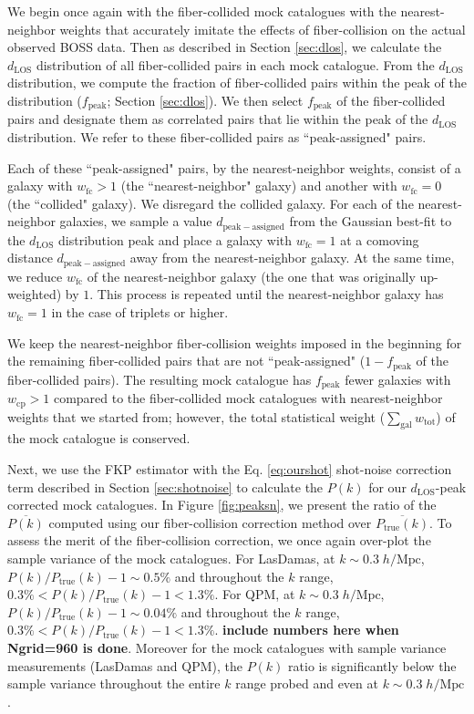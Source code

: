 \documentclass{emulateapj}
\begin{document}
We begin once again with the fiber-collided mock catalogues with the nearest-neighbor weights that accurately imitate the effects of fiber-collision on the actual observed BOSS data. Then as described in Section \ref{sec:dlos}, we calculate the $d_\mathrm{LOS}$ distribution of all fiber-collided pairs in each mock catalogue. From the $d_\mathrm{LOS}$ distribution, we compute the fraction of fiber-collided pairs within the peak of the distribution ($f_\mathrm{peak}$; Section \ref{sec:dlos}). We then select $f_\mathrm{peak}$ of the fiber-collided pairs and designate them as correlated pairs that lie within the peak of the $d_\mathrm{LOS}$ distribution. We refer to these fiber-collided pairs as ``peak-assigned" pairs.  

Each of these ``peak-assigned" pairs, by the nearest-neighbor weights, consist of a galaxy with $w_\mathrm{fc} > 1$ (the ``nearest-neighbor" galaxy) and another with $w_\mathrm{fc} = 0$ (the ``collided" galaxy). We disregard the collided galaxy. For each of the nearest-neighbor galaxies, we sample a value $d_\mathrm{peak-assigned}$ from the Gaussian best-fit to the $d_\mathrm{LOS}$ distribution peak and place a galaxy with $w_\mathrm{fc} = 1$ at a comoving distance $d_\mathrm{peak-assigned}$ away from the nearest-neighbor galaxy. At the same time, we reduce $w_\mathrm{fc}$ of the nearest-neighbor galaxy (the one that was originally up-weighted) by $1$. This process is repeated until the nearest-neighbor galaxy has $w_\mathrm{fc} =1$ in the case of triplets or higher. 

We keep the nearest-neighbor fiber-collision weights imposed in the beginning for the remaining fiber-collided pairs that are not ``peak-assigned" ($1-f_\mathrm{peak}$ of the fiber-collided pairs). The resulting mock catalogue has $f_\mathrm{peak}$ fewer galaxies with $w_\mathrm{cp} > 1$ compared to the fiber-collided mock catalogues with nearest-neighbor weights that we started from; however, the total statistical weight ($\sum_\mathrm{gal} w_\mathrm{tot}$) of the mock catalogue is conserved. 

Next, we use the FKP estimator with the Eq. \ref{eq:ourshot} shot-noise correction term described in Section \ref{sec:shotnoise} to calculate the $P(k)$ for our $d_\mathrm{LOS}$-peak corrected mock catalogues. In Figure \ref{fig:peaksn}, we present the ratio of the $\overline{P(k)}$ computed using our fiber-collision correction method over $\overline{P_\mathrm{true}(k)}$. To assess the merit of the fiber-collision correction, we once again over-plot the sample variance of the mock catalogues. For LasDamas, at $k \sim 0.3 \; h/\mathrm{Mpc}$, $P(k)/P_\mathrm{true}(k) - 1 \sim 0.5 \%$ and throughout the $k$ range, $0.3 \% < P(k)/P_\mathrm{true}(k) - 1 < 1.3 \%$. For QPM, at $k \sim 0.3 \; h/\mathrm{Mpc}$, $P(k)/P_\mathrm{true}(k) - 1 \sim 0.04 \%$ and throughout the $k$ range, $0.3 \% < P(k)/P_\mathrm{true}(k) - 1 < 1.3 \%$. {\bf include numbers here when Ngrid=960 is done}. Moreover for the mock catalogues with sample variance measurements (LasDamas and QPM), the $P(k)$ ratio is significantly below the sample variance throughout the entire $k$ range probed and even at $k\sim 0.3\;h/\mathrm{Mpc}$. 
\end{document}
